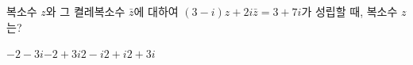 복소수 $z$와 그 켤레복소수 $\bar{z}$에 대하여 $(3-i)z+2i\bar{z}=3+7i$가 성립할 때, 복소수 $z$는?
\begin{choices32}{$-2-3i$}{$-2+3i$}{$2-i$}{$2+i$}{$2+3i$}\end{choices32}

